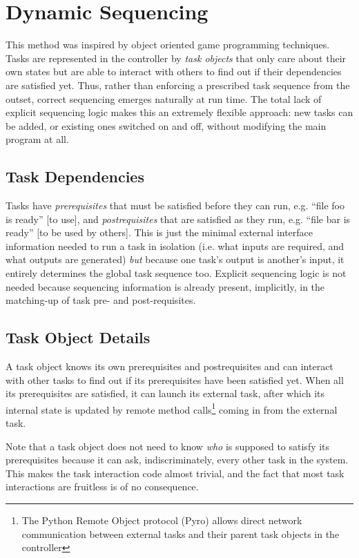 \documentclass[a4paper,12pt]{amsart}
\begin{document}
\section{Dynamic Sequencing}

This method was inspired by object oriented game programming techniques.
Tasks are represented in the controller by {\em task objects} that only
care about their own states but are able to interact with others to find
out if their dependencies are satisfied yet. Thus, rather than enforcing
a prescribed task sequence from the outset, correct sequencing emerges
naturally at run time.  The total lack of explicit sequencing logic
makes this an extremely flexible approach: new tasks can be added, or
existing ones switched on and off, without modifying the main program at
all.


\subsection{Task Dependencies}

Tasks have {\em prerequisites} that must be satisfied before they can
run, e.g. ``file foo is ready'' [to use], and {\em postrequisites} that
are satisfied as they run, e.g. ``file bar is ready'' [to be used by
others]. This is just the minimal external interface information needed
to run a task in isolation (i.e. what inputs are required, and what
outputs are generated) {\em but} because one task's output is another's
input, it entirely determines the global task sequence too. Explicit
sequencing logic is not needed because sequencing information is already
present, implicitly, in the matching-up of task pre- and
post-requisites. 

\subsection{Task Object Details}

A task object knows its own prerequisites and postrequisites and can
interact with other tasks to find out if its prerequisites have been
satisfied yet. When all its prerequisites are satisfied, it can launch
its external task, after which its internal state is updated by remote
method calls\footnote{The Python Remote Object protocol (Pyro) allows
direct network communication between external tasks and their parent
task objects in the controller} coming in from the external task. 

Note that a task object does not need to know {\em who} is supposed to
satisfy its prerequisites because it can ask, indiscriminately, every
other task in the system. This makes the task interaction code almost
trivial, and the fact that most task interactions are fruitless is of no
consequence. 
\end{document}
